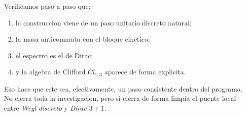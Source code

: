 Verificamos paso a paso que:
\begin{enumerate}[label=\arabic*.]
    \item la construccion viene de un paso unitario discreto natural;
    \item la masa anticommuta con el bloque cinetico;
    \item el espectro es el de Dirac;
    \item y la algebra de Clifford \(Cl_{1,3}\) aparece de forma explicita.
\end{enumerate}

Eso hace que este sea, efectivamente, un paso consistente dentro del programa. No cierra toda la investigacion, pero si cierra de forma limpia el puente local entre \textit{Weyl discreto} y \textit{Dirac \(3+1\)}.
